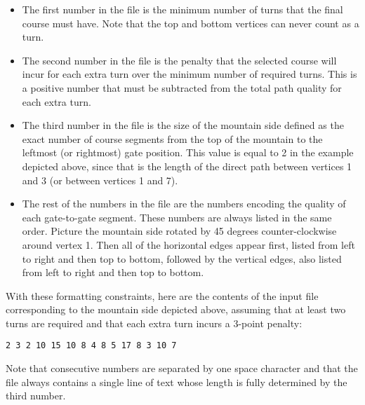 \documentclass[12pt]{article}
\begin{document}
\begin{enumerate}
{    \begin{itemize}
    \item The first number in the file is the minimum number of turns
      that the final course must have. Note that the top and bottom
      vertices can never count as a turn.
    \item The second number in the file is the penalty that the
      selected course will incur for each extra turn over the minimum
      number of required turns. This is a positive number that must be
      subtracted from the total path  quality for each extra turn.
    \item The third number in the file is the size of the mountain
      side defined as the exact number of course segments from the top
      of the mountain to the leftmost (or rightmost) gate
      position. This value is equal to 2 in the example depicted
      above, since that is the length of the direct path between
      vertices 1 and 3 (or between vertices 1 and 7).
    \item The rest of the numbers in the file are the numbers encoding
      the quality of each gate-to-gate segment. These numbers are
      always listed in the same order. Picture the mountain side
      rotated by 45 degrees counter-clockwise around vertex 1. Then
      all of the horizontal edges appear first, listed from left to
      right and then top to bottom, followed by the vertical edges,
      also listed from left to right and then top to bottom.
    \end{itemize}

    With these formatting constraints, here are the contents of the
    input file corresponding to the mountain side depicted above,
    assuming that at least two turns are required and that each extra
    turn incurs a 3-point penalty:

\begin{verbatim}
2 3 2 10 15 10 8 4 8 5 17 8 3 10 7
\end{verbatim}

Note that consecutive numbers are separated by one space character and
that the file always contains a single line of text whose length is
fully determined by the third number.

}
\end{enumerate}
\end{document}
